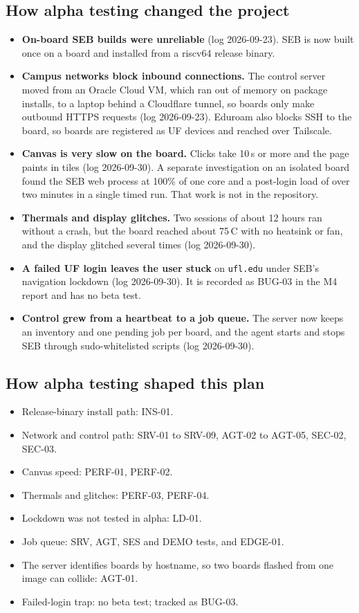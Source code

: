 \documentclass[11pt]{article}
\begin{document}
\subsection{How alpha testing changed the project}

\begin{itemize}\setlength{\itemsep}{0.12em}
  \item \textbf{On-board SEB builds were unreliable} (log 2026-09-23). SEB is now built once on a board and installed from a riscv64 release binary.
  \item \textbf{Campus networks block inbound connections.} The control server moved from an Oracle Cloud VM, which ran out of memory on package installs, to a laptop behind a Cloudflare tunnel, so boards only make outbound HTTPS requests (log 2026-09-23). Eduroam also blocks SSH to the board, so boards are registered as UF devices and reached over Tailscale.
  \item \textbf{Canvas is very slow on the board.} Clicks take 10\,s or more and the page paints in tiles (log 2026-09-30). A separate investigation on an isolated board found the SEB web process at 100\% of one core and a post-login load of over two minutes in a single timed run. That work is not in the repository.
  \item \textbf{Thermals and display glitches.} Two sessions of about 12 hours ran without a crash, but the board reached about 75\,\textdegree{}C with no heatsink or fan, and the display glitched several times (log 2026-09-30).
  \item \textbf{A failed UF login leaves the user stuck} on \texttt{ufl.edu} under SEB's navigation lockdown (log 2026-09-30). It is recorded as BUG-03 in the M4 report and has no beta test.
  \item \textbf{Control grew from a heartbeat to a job queue.} The server now keeps an inventory and one pending job per board, and the agent starts and stops SEB through sudo-whitelisted scripts (log 2026-09-30).
\end{itemize}

\subsection{How alpha testing shaped this plan}

\begin{itemize}\setlength{\itemsep}{0.12em}
  \item Release-binary install path: INS-01.
  \item Network and control path: SRV-01 to SRV-09, AGT-02 to AGT-05, SEC-02, SEC-03.
  \item Canvas speed: PERF-01, PERF-02.
  \item Thermals and glitches: PERF-03, PERF-04.
  \item Lockdown was not tested in alpha: LD-01.
  \item Job queue: SRV, AGT, SES and DEMO tests, and EDGE-01.
  \item The server identifies boards by hostname, so two boards flashed from one image can collide: AGT-01.
  \item Failed-login trap: no beta test; tracked as BUG-03.
\end{itemize}
\end{document}
